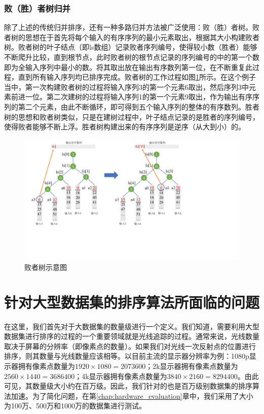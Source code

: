 \subsubsection{败（胜）者树归并}
除了上述的传统归并排序，还有一种多路归并方法被广泛使用：败（胜）者树。败者树的思想在于首先将每个输入的有序序列的最小元素取出，根据其大小构建败者树。败者树的叶子结点（即ls数组）记录败者序列编号，使得较小数（胜者）能够不断爬升比较，直到根节点，此时败者树的根节点记录的序列编号的中的第一个数即为全输入序列中最小的数。将其取出放在输出有序数列第一位，在不断重复此过程，直到所有输入序列均已排序完成。败者树的工作过程如图\ref{fig:loser_tree}所示。在这个例子当中，第一次构建败者树的过程将输入序列3的第一个元素6取出，然后序列3中元素前进一位。第二次建树的过程将输入序列1的第一个元素9取出，作为输出有序序列的第二个元素，由此不断循环，即可得到五个输入序列的整体的有序数列。胜者树的思想和败者树类似，只是在建树过程中，叶子结点记录的是胜者的序列编号，使得败者能够不断上浮。胜者树构建出来的有序序列是逆序（从大到小）的。
\begin{figure}[htbp]
    \centering
    \includegraphics[width=\linewidth]{figures/loser_tree.pdf}
    \caption{败者树示意图}
    \label{fig:loser_tree}
\end{figure}


\section{针对大型数据集的排序算法所面临的问题}\label{facing_problems}

在这里，我们首先对于大数据集的数量级进行一个定义。我们知道，需要利用大型数据集进行排序的过程的一个重要领域就是光线追踪的过程。通常来说，光线数量取决于屏幕的分辨率（即像素点的数量）。如果我们对光线一次反射点的位置进行排序，则其数量与光线数量应该相等。以目前主流的显示器分辨率为例：1080p显示器拥有像素点数量为$1920\times 1080=2073600$；2k显示器拥有像素点数量为$2560\times1440=3686400$；4k显示器拥有像素点数量为$3840\times2160=8294400$。由此可见，其数量级大小约在百万级。因此，我们针对的也是百万级别数据集的排序算法加速。为了简化问题，在第\ref{chap:hardware_evaluation}章中，我们采用了大小为100万、500万和1000万的数据集进行测试。

